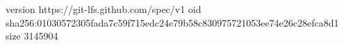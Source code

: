 version https://git-lfs.github.com/spec/v1
oid sha256:01030572305fada7c59f715edc24e79b58c830975721053ee74e26c28efca8d1
size 3145904
